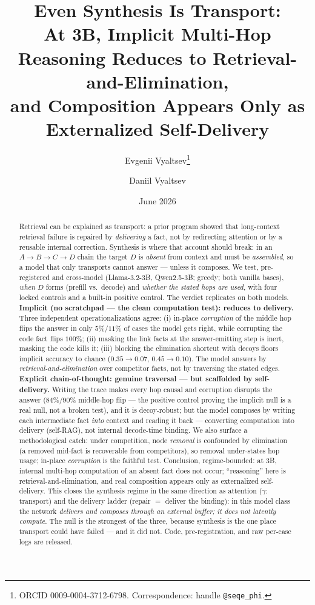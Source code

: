 \documentclass[11pt]{article}
\title{\bfseries Even Synthesis Is Transport:\\
At 3B, Implicit Multi-Hop Reasoning Reduces to Retrieval-and-Elimination,\\
and Composition Appears Only as Externalized Self-Delivery}
\author[1]{Evgenii Vyaltsev\thanks{ORCID 0009-0004-3712-6798. Correspondence: handle \texttt{@seqe\_phi}.}}
\author[1]{Daniil Vyaltsev}
\affil[1]{Independent Researcher}
\date{June 2026}
\begin{document}
\maketitle

\begin{abstract}
\noindent
Retrieval can be explained as transport: a prior program showed that long-context
retrieval failure is repaired by \emph{delivering} a fact, not by redirecting
attention or by a reusable internal correction. Synthesis is where that account
should break: in an $A\!\to\!B\!\to\!C\!\to\!D$ chain the target $D$ is \emph{absent}
from context and must be \emph{assembled}, so a model that only transports cannot
answer --- unless it composes. We test, pre-registered and cross-model
(Llama-3.2-3B, Qwen2.5-3B; greedy; both vanilla bases), \emph{when} $D$ forms
(prefill vs.\ decode) and \emph{whether the stated hops are used}, with four locked
controls and a built-in positive control. The verdict replicates on both models.
\textbf{Implicit (no scratchpad --- the clean computation test): reduces to delivery.}
Three independent operationalizations agree: (i) in-place \emph{corruption} of the
middle hop flips the answer in only $5\%$/$11\%$ of cases the model gets right, while
corrupting the code fact flips $100\%$; (ii) masking the link facts at the
answer-emitting step is inert, masking the code kills it; (iii) blocking the
elimination shortcut with decoys floors implicit accuracy to chance
($0.35\!\to\!0.07$, $0.45\!\to\!0.10$). The model answers by
\emph{retrieval-and-elimination} over competitor facts, not by traversing the stated
edges. \textbf{Explicit chain-of-thought: genuine traversal --- but scaffolded by
self-delivery.} Writing the trace makes every hop causal and corruption disrupts the
answer ($84\%$/$90\%$ middle-hop flip --- the positive control proving the implicit
null is a real null, not a broken test), and it is decoy-robust; but the model
composes by writing each intermediate fact \emph{into} context and reading it back ---
converting computation into delivery (self-RAG), not internal decode-time binding.
We also surface a methodological catch: under competition, node \emph{removal} is
confounded by elimination (a removed mid-fact is recoverable from competitors), so
removal under-states hop usage; in-place \emph{corruption} is the faithful test.
Conclusion, regime-bounded: at $3$B, internal multi-hop computation of an absent fact
does not occur; ``reasoning'' here is retrieval-and-elimination, and real composition
appears only as externalized self-delivery. This closes the synthesis regime in the
same direction as attention ($\gamma$: transport) and the delivery ladder
(repair $=$ deliver the binding): in this model class the network \emph{delivers and
composes through an external buffer; it does not latently compute}. The null is the
strongest of the three, because synthesis is the one place transport could have
failed --- and it did not. Code, pre-registration, and raw per-case logs are released.
\end{abstract}
\end{document}

